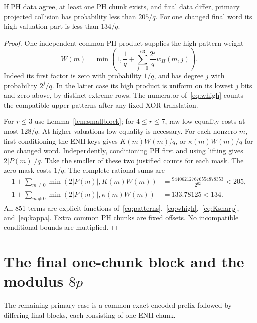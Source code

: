 \begin{theorem}\label{thm:205}
If PH data agree, at least one PH chunk exists, and final data differ, primary projected collision has probability less than $205/q$. For one changed final word its high-valuation part is less than $134/q$.
\end{theorem}
\begin{proof}
One independent common PH product supplies the high-pattern weight
\begin{equation}\label{eq:forced}
 W(m)=\min\left(1,\frac1q+\sum_{j=0}^{63}\frac{2^j}{q}w_H(m,j)\right).
\end{equation}
Indeed its first factor is zero with probability $1/q$, and has degree $j$ with probability $2^j/q$. In the latter case its high product is uniform on its lowest $j$ bits and zero above, by distinct extreme rows. The numerator of~\eqref{eq:whigh} counts the compatible upper patterns after any fixed XOR translation.

For $r\le3$ use Lemma~\ref{lem:smallblock}; for $4\le r\le7$, raw low equality costs at most $128/q$. At higher valuations low equality is necessary. For each nonzero $m$, first conditioning the ENH keys gives $K(m)W(m)/q$, or $\kappa(m)W(m)/q$ for one changed word. Independently, conditioning PH first and using lifting gives $2|P(m)|/q$. Take the smaller of these two justified counts for each mask. The zero mask costs $1/q$. The complete rational sums are
\begin{align}
1+\sum_{m\ne0}\min(2|P(m)|,K(m)W(m))
 &=\frac{944062127676554878353}{2^{62}}<205,\label{eq:205sum}\\
1+\sum_{m\ne0}\min(2|P(m)|,\kappa(m)W(m))&=133.78125<134.\nonumber
\end{align}
All 851 terms are explicit functions of~\eqref{eq:patterns},~\eqref{eq:whigh},~\eqref{eq:Ksharp}, and~\eqref{eq:kappa}. Extra common PH chunks are fixed offsets. No incompatible conditional bounds are multiplied.
\end{proof}

\section{The final one-chunk block and the modulus \texorpdfstring{$8p$}{8p}}\label{sec:8p}
The remaining primary case is a common exact encoded prefix followed by differing final blocks, each consisting of one ENH chunk.

